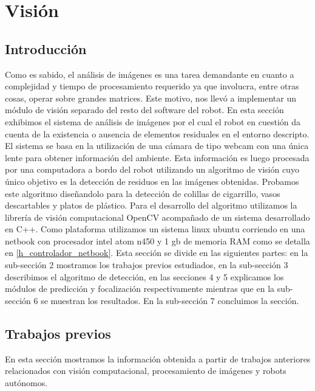﻿\section{\label{sec:vision}Visi\'on}

\subsection{Introducci\'on}
Como es sabido, el an\'alisis de im\'agenes es una tarea demandante en cuanto a complejidad
y tiempo de procesamiento requerido ya que involucra, entre otras cosas, operar sobre grandes matrices. Este motivo, nos llev\'o a 
implementar un m\'odulo de visi\'on separado del resto del software del robot.
En esta secci\'on exhibimos el sistema de an\'alisis de im\'agenes por 
el cual el robot en cuesti\'on da cuenta de la existencia o ausencia de 
elementos residuales en el entorno descripto.  El sistema se basa en la 
utilizaci\'on de una c\'amara de tipo webcam con una \'unica lente para 
obtener informaci\'on del ambiente. Esta informaci\'on es luego procesada 
por una computadora a bordo del robot utilizando un algoritmo de visi\'on 
cuyo \'unico objetivo es la detecci\'on de residuos 
en las im\'agenes obtenidas. Probamos este algoritmo dise\~nandolo para la detecci\'on de 
colillas de cigarrillo, vasos descartables y platos de pl\'astico. Para 
el desarrollo del algoritmo utilizamos la librer\'ia de visi\'on 
computacional OpenCV \cite{opencv_library} acompa\~nado de un sistema 
desarrollado en C++. Como plataforma utilizamos un sistema linux 
ubuntu corriendo en una netbook con procesador intel atom 
n450 y 1 gb de memoria RAM como se detalla en \ref{h_controlador_netbook}.
Esta secci\'on se divide en las siguientes partes: en la sub-secci\'on 2 mostramos  
los trabajos previos estudiados, en la sub-secci\'on 3 describimos el algoritmo de detecci\'on, 
en las secciones 4 y 5 explicamos los m\'odulos de predicci\'on y focalizaci\'on respectivamente mientras que en la 
sub-secci\'on 6 se muestran los resultados. En la sub-secci\'on 7 concluimos 
la secci\'on.

\subsection{Trabajos previos}
En esta secci\'on mostramos la informaci\'on obtenida a partir de 
trabajos anteriores relacionados con visi\'on computacional, 
procesamiento de im\'agenes y robots aut\'onomos.
 
